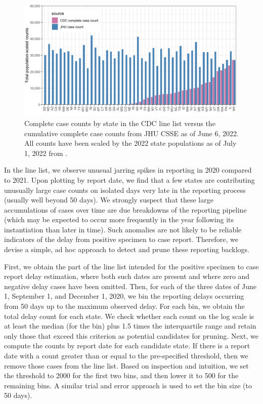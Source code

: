 \documentclass{article}
\begin{document}
\begin{figure}[!tb]
\centering
    \includegraphics[width=0.99\textwidth]{prop_cc_cdc_vs_jhu.pdf} 
    \caption{Complete case counts by state in the CDC line list versus the 
    cumulative complete case counts from JHU CSSE as of June 6, 2022.
     All counts have been scaled by the 2022 state populations as of
     July 1, 2022 from \citet{uscensus2022annual}.}
    \label{fig:prop_cc_cdc_vs_jhu}
\end{figure}

In the line list, we observe unusual jarring spikes in reporting in 2020 compared
to 2021. Upon plotting by report date, we find that a few states are
contributing unusually large case counts on isolated days very late in the
reporting process (usually well beyond 50 days). We strongly suspect that
these large accumulations of cases over time are due breakdowns of the reporting
pipeline (which may be expected to occur more frequently in the year following
its instantiation than later in time). Such anomalies are not likely to be reliable
indicators of the delay from positive specimen to case report. Therefore, we devise
a simple, ad hoc approach to detect and prune these reporting backlogs.

First, we obtain the part of the line list intended for the positive specimen to case report delay estimation,
where both such dates are present and where zero and negative delay cases have been omitted. 
Then, for each of the three dates of June 1, September 1, and
December 1, 2020, we bin the reporting delays occurring
from 50 days up to the maximum observed delay. For each bin, we obtain
the total delay count for each state. We check whether each count on the
log scale is at least the median (for the bin) plus 1.5 times the
interquartile range and retain only those that exceed this criterion as potential
candidates for pruning. Next, we compute the counts by report date for each
candidate state. If there is a report date with a count greater than or equal to
the pre-specified threshold, then we remove those cases from the line list.
Based on inspection and intuition, we set the threshold to 2000 for the
first two bins, and then lower it to 500 for the remaining bins. 
A similar trial and error approach is used to set the bin size (to 50 days). %
\end{document}
